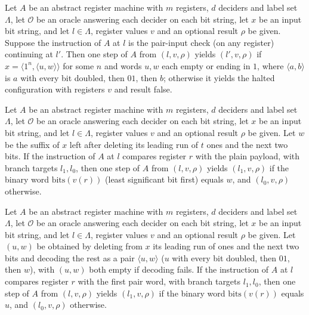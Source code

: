 \begin{lemma}
\label{Complexity.LogProg.astep_valQ}
\leanok
{}
Let $A$ be an abstract register machine with $m$ registers, $d$ deciders and label set
$\Lambda$, let $\mathcal{O}$ be an oracle answering each decider on each bit string, let
$x$ be an input bit string, and let $l\in\Lambda$, register values $v$ and an optional
result $\rho$ be given. Suppose the instruction of $A$ at $l$ is the pair-input check
(on any register) continuing at $l'$. Then one step of $A$ from $(l,v,\rho)$ yields
$(l',v,\rho)$ if $x=\langle 1^n,\langle u,w\rangle\rangle$ for some $n$ and words $u,w$
each empty or ending in $1$, where $\langle a,b\rangle$ is $a$ with every bit doubled,
then $01$, then $b$; otherwise it yields the halted configuration with registers $v$ and
result false.
\end{lemma}

\begin{lemma}
\label{Complexity.LogProg.astep_jeqIn}
\leanok
{}
Let $A$ be an abstract register machine with $m$ registers, $d$ deciders and label set
$\Lambda$, let $\mathcal{O}$ be an oracle answering each decider on each bit string, let
$x$ be an input bit string, and let $l\in\Lambda$, register values $v$ and an optional
result $\rho$ be given. Let $w$ be the suffix of $x$ left after deleting its leading run
of $t$ ones and the next two bits. If the instruction of $A$ at $l$ compares register $r$
with the plain payload, with branch targets $l_1,l_0$, then one step of $A$ from
$(l,v,\rho)$ yields $(l_1,v,\rho)$ if the binary word $\mathrm{bits}(v(r))$ (least
significant bit first) equals $w$, and $(l_0,v,\rho)$ otherwise.
\end{lemma}

\begin{lemma}
\label{Complexity.LogProg.astep_jeqFst}
\leanok
{}
Let $A$ be an abstract register machine with $m$ registers, $d$ deciders and label set
$\Lambda$, let $\mathcal{O}$ be an oracle answering each decider on each bit string, let
$x$ be an input bit string, and let $l\in\Lambda$, register values $v$ and an optional
result $\rho$ be given. Let $(u,w)$ be obtained by deleting from $x$ its leading run of
ones and the next two bits and decoding the rest as a pair $\langle u,w\rangle$ ($u$ with
every bit doubled, then $01$, then $w$), with $(u,w)$ both empty if decoding fails. If
the instruction of $A$ at $l$ compares register $r$ with the first pair word, with branch
targets $l_1,l_0$, then one step of $A$ from $(l,v,\rho)$ yields $(l_1,v,\rho)$ if the
binary word $\mathrm{bits}(v(r))$ equals $u$, and $(l_0,v,\rho)$ otherwise.
\end{lemma}


